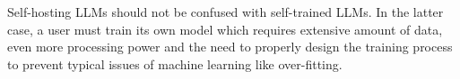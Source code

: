 Self-hosting \acfp{LLM} should not be confused with self-trained \acp{LLM}. In the latter case, a user must train its own model which requires extensive amount of data, even more processing power and the need to properly design the training process to prevent typical issues of machine learning like over-fitting.


